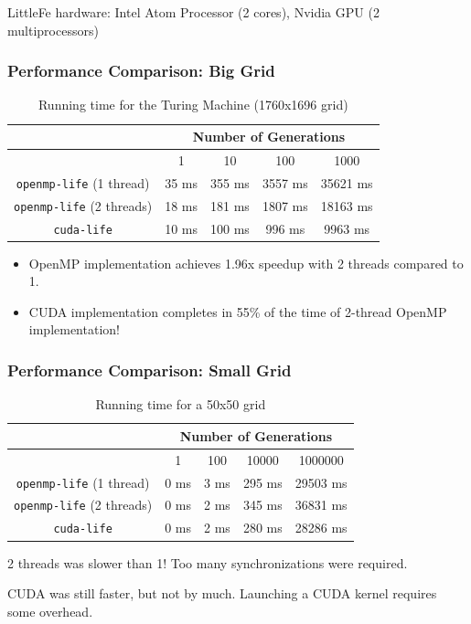 \documentclass{beamer}
\begin{document}
\begin{frame}
	LittleFe hardware:  Intel Atom Processor (2 cores), Nvidia GPU (2
	multiprocessors)
	\frametitle{Performance Comparison: Big Grid}
	\begin{table}[H]
	\caption{Running time for the Turing Machine (1760x1696 grid)}
	\begin{tabular}{c|c|c|c|c|}
	& \multicolumn{4}{c}{\bf Number of Generations} \\ \hline
				& 1 & 10 & 100 & 1000
				\\ \hline
	{\tt openmp-life} (1 thread) & 35 ms & 355 ms & 3557 ms & 35621 ms \\ \hline
	{\tt openmp-life} (2 threads) & 18 ms & 181 ms & 1807 ms & 18163 ms \\ \hline
	{\tt cuda-life}   & 10 ms & 100 ms & 996 ms  & 9963 ms    \\ \hline
	\end{tabular}
	\end{table}
	\begin{itemize}
	\item OpenMP implementation achieves 1.96x speedup with 2 threads compared to 1.
	\item CUDA implementation completes in 55\% of the time of 2-thread OpenMP
	implementation! 
	\end{itemize}
\end{frame}
\begin{frame}
	\frametitle{Performance Comparison: Small Grid}
	\begin{table}[H]
	\caption{Running time for a 50x50 grid}
	\begin{tabular}{c|c|c|c|c|}
	& \multicolumn{4}{c}{\bf Number of Generations} \\ \hline
				& 1 & 100 & 10000 & 1000000 \\ \hline
	{\tt openmp-life} (1 thread)& 0 ms & 3 ms & 295 ms & 29503 ms \\ \hline
	{\tt openmp-life} (2 threads)& 0 ms & 2 ms & 345 ms & 36831 ms \\ \hline
	{\tt cuda-life}   & 0 ms & 2 ms & 280 ms  &  28286 ms    \\ \hline
	\end{tabular}
	\end{table}

	2 threads was slower than 1! Too many synchronizations were required.

	CUDA was still faster, but not by much.  Launching a CUDA kernel requires
	some overhead.
\end{frame}
\end{document}
